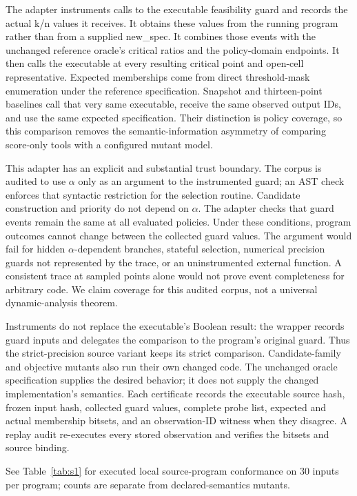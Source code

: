 \documentclass[11pt,a4paper]{article}
\theoremstyle{plain}
\theoremstyle{definition}
\theoremstyle{remark}
\begin{document}
The adapter instruments calls to the executable feasibility guard and records the actual k/n values it receives. It obtains these values from the running program rather than from a supplied new\_spec. It combines those events with the unchanged reference oracle's critical ratios and the policy-domain endpoints. It then calls the executable at every resulting critical point and open-cell representative. Expected memberships come from direct threshold-mask enumeration under the reference specification. Snapshot and thirteen-point baselines call that very same executable, receive the same observed output IDs, and use the same expected specification. Their distinction is policy coverage, so this comparison removes the semantic-information asymmetry of comparing score-only tools with a configured mutant model.

This adapter has an explicit and substantial trust boundary. The corpus is audited to use $\alpha$ only as an argument to the instrumented guard; an AST check enforces that syntactic restriction for the selection routine. Candidate construction and priority do not depend on $\alpha$. The adapter checks that guard events remain the same at all evaluated policies. Under these conditions, program outcomes cannot change between the collected guard values. The argument would fail for hidden $\alpha$-dependent branches, stateful selection, numerical precision guards not represented by the trace, or an uninstrumented external function. A consistent trace at sampled points alone would not prove event completeness for arbitrary code. We claim coverage for this audited corpus, not a universal dynamic-analysis theorem.

Instruments do not replace the executable's Boolean result: the wrapper records guard inputs and delegates the comparison to the program's original guard. Thus the strict-precision source variant keeps its strict comparison. Candidate-family and objective mutants also run their own changed code. The unchanged oracle specification supplies the desired behavior; it does not supply the changed implementation's semantics. Each certificate records the executable source hash, frozen input hash, collected guard values, complete probe list, expected and actual membership bitsets, and an observation-ID witness when they disagree. A replay audit re-executes every stored observation and verifies the bitsets and source binding.

See Table~\ref{tab:s1} for executed local source-program conformance on 30 inputs per program; counts are separate from declared-semantics mutants.
\end{document}
